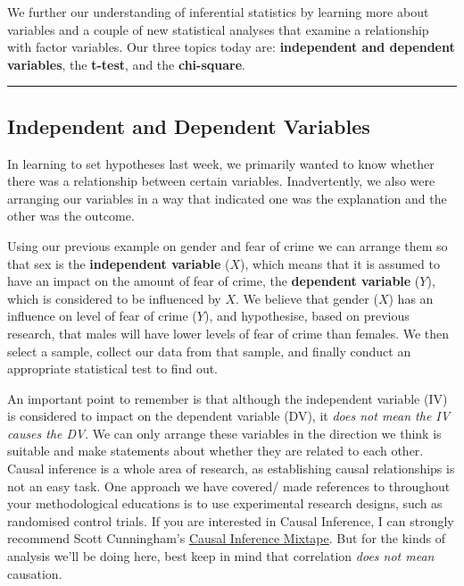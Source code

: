 \documentclass[
]{book}
\begin{document}
We further our understanding of inferential statistics by learning more about variables and a couple of new statistical analyses that examine a relationship with factor variables. Our three topics today are: \textbf{independent and dependent variables}, the \textbf{t-test}, and the \textbf{chi-square}.

\begin{center}\rule{0.5\linewidth}{0.5pt}\end{center}

\hypertarget{independent-and-dependent-variables}{%
\subsection{Independent and Dependent Variables}\label{independent-and-dependent-variables}}

In learning to set hypotheses last week, we primarily wanted to know whether there was a relationship between certain variables. Inadvertently, we also were arranging our variables in a way that indicated one was the explanation and the other was the outcome.

Using our previous example on gender and fear of crime we can arrange them so that sex is the \textbf{independent variable} (\(X\)), which means that it is assumed to have an impact on the amount of fear of crime, the \textbf{dependent variable} (\(Y\)), which is considered to be influenced by \(X\). We believe that gender (\(X\)) has an influence on level of fear of crime (\(Y\)), and hypothesise, based on previous research, that males will have lower levels of fear of crime than females. We then select a sample, collect our data from that sample, and finally conduct an appropriate statistical test to find out.

An important point to remember is that although the independent variable (IV) is considered to impact on the dependent variable (DV), it \emph{does not mean the IV causes the DV}. We can only arrange these variables in the direction we think is suitable and make statements about whether they are related to each other. Causal inference is a whole area of research, as establishing causal relationships is not an easy task. One approach we have covered/ made references to throughout your methodological educations is to use experimental research designs, such as randomised control trials. If you are interested in Causal Inference, I can strongly recommend Scott Cunningham's \href{https://www.scunning.com/mixtape.html}{Causal Inference Mixtape}. But for the kinds of analysis we'll be doing here, best keep in mind that correlation \emph{does not mean} causation.
\end{document}
